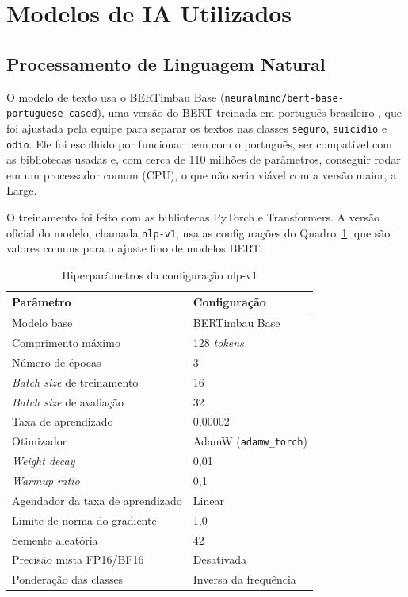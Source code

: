 \documentclass[
    12pt,           %
    oneside,        %
    a4paper,        %
    chapter=TITLE,  %
    english,        %
    brazil          %
]{abntex2}
\begin{document}
\section{Modelos de IA Utilizados}

\subsection{Processamento de Linguagem Natural}

O modelo de texto usa o BERTimbau Base
(\texttt{neuralmind/bert-base-portuguese-cased}), uma versão do BERT treinada
em português brasileiro \cite{souza2020}, que foi ajustada pela equipe para
separar os textos nas classes \texttt{seguro}, \texttt{suicidio} e
\texttt{odio}. Ele foi escolhido por funcionar bem com o português, ser
compatível com as bibliotecas usadas e, com cerca de 110 milhões de
parâmetros, conseguir rodar em um processador comum (CPU), o que não seria
viável com a versão maior, a Large.

O treinamento foi feito com as bibliotecas PyTorch e Transformers. A versão
oficial do modelo, chamada \texttt{nlp-v1}, usa as configurações do
Quadro~\ref{tab:hiperparametros}, que são valores comuns para o ajuste fino
de modelos BERT.
\begin{table}[htbp]
\centering
\small
\renewcommand{\arraystretch}{1.3}
\begin{tabular}{|l|l|}
\hline
\textbf{Parâmetro} & \textbf{Configuração} \\
\hline
Modelo base & BERTimbau Base \\
\hline
Comprimento máximo & 128 \textit{tokens} \\
\hline
Número de épocas & 3 \\
\hline
\textit{Batch size} de treinamento & 16 \\
\hline
\textit{Batch size} de avaliação & 32 \\
\hline
Taxa de aprendizado & 0,00002 \\
\hline
Otimizador & AdamW (\texttt{adamw\_torch}) \\
\hline
\textit{Weight decay} & 0,01 \\
\hline
\textit{Warmup ratio} & 0,1 \\
\hline
Agendador da taxa de aprendizado & Linear \\
\hline
Limite de norma do gradiente & 1,0 \\
\hline
Semente aleatória & 42 \\
\hline
Precisão mista FP16/BF16 & Desativada \\
\hline
Ponderação das classes & Inversa da frequência \\
\hline
\end{tabular}
\caption{Hiperparâmetros da configuração nlp-v1}
\label{tab:hiperparametros}
\end{table}
\end{document}
